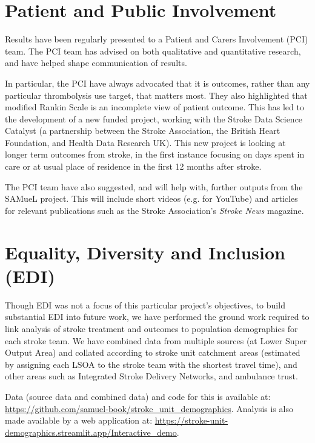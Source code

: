 
\section{Patient and Public Involvement}

Results have been regularly presented to a Patient and Carers Involvement (PCI) team. The PCI team has advised on both qualitative and quantitative research, and have helped shape communication of results.

In particular, the PCI have always advocated that it is outcomes, rather than any particular thrombolysis use target, that matters most. They also highlighted that modified Rankin Scale is an incomplete view of patient outcome. This has led to the development of a new funded project, working with the Stroke Data Science Catalyst (a partnership between the Stroke Association, the British Heart Foundation, and Health Data Research UK). This new project is looking at longer term outcomes from stroke, in the first instance focusing on days spent in care or at usual place of residence in the first 12 months after stroke.

The PCI team have also suggested, and will help with, further outputs from the SAMueL project. This will include short videos (e.g. for YouTube) and articles for relevant publications such as the Stroke Association's \textit{Stroke News} magazine.

\section{Equality, Diversity and Inclusion (EDI)}

Though EDI was not a focus of this particular project's objectives, to build substantial EDI into future work, we have performed the ground work required to link analysis of stroke treatment and outcomes to population demographics for each stroke team. We have combined data from multiple sources (at Lower Super Output Area) and collated according to stroke unit catchment areas (estimated by assigning each LSOA to the stroke team with the shortest travel time), and other areas such as Integrated Stroke Delivery Networks, and ambulance trust.

Data (source data and combined data) and code for this is available at: \url{https://github.com/samuel-book/stroke_unit_demographics}. Analysis is also made available by a web application at: \url{https://stroke-unit-demographics.streamlit.app/Interactive_demo}.

